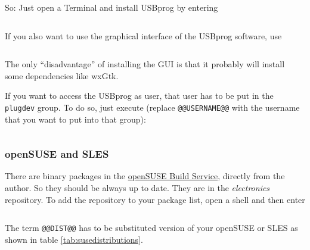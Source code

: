 \documentclass[bibtotoc,UKenglish,halfparskip,oneside,DIV12]{scrreprt}
\begin{document}
So: Just open a Terminal and install USBprog by entering

\begin{lstlisting}[style=inline]
% sudo aptitude install usbprog
\end{lstlisting}

If you also want to use the graphical interface of the USBprog software, use

\begin{lstlisting}[style=inline]
% sudo aptitude install usbprog usbprog-gui
\end{lstlisting}

The only ``disadvantage'' of installing the GUI is that it probably will install some dependencies
like wxGtk.

If you want to access the USBprog as user, that user has to be put in the \texttt{plugdev} group. To
do so, just execute (replace \texttt{@@USERNAME@@} with the username that you want to put into that
group):

\begin{lstlisting}[style=inline]
% sudo usermod -aG plugdev @@USERNAME@@
\end{lstlisting}

\subsubsection{openSUSE and SLES}

There are binary packages in the \href{https://build.opensuse.org/}{openSUSE Build Service},
directly from the author. So they should be always up to date. They are in the \emph{electronics}
repository. To add the repository to your package list, open a shell and then enter

\begin{lstlisting}[style=inline]
% sudo zypper ar -r http://repos.opensuse.org/electronics/@@DIST@@/electronics.repo
\end{lstlisting}

The term \texttt{@@DIST@@} has to be substituted version of your openSUSE or SLES as shown in table
\vref{tab:susedistributions}.
\end{document}
